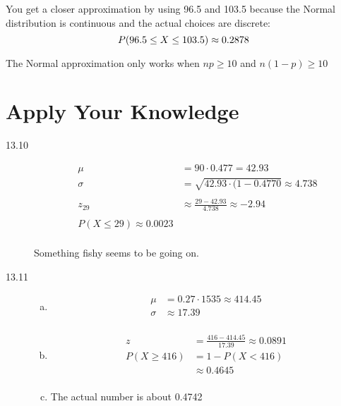 \documentclass[landscape]{exam}
\begin{document}
  You get a closer approximation by using 96.5 and 103.5 because the Normal
  distribution is continuous and the actual choices are discrete:
  \[
    P(96.5 \leq X \leq 103.5) \approx 0.2878 \\
  \]

  The Normal approximation only works when $np \geq 10$ and $n(1 - p) \geq 10$

  \section{Apply Your Knowledge}
  \begin{description}
    \item[13.10]
      \begin{align*}
        \mu &= 90 \cdot 0.477 = 42.93 \\
        \sigma &= \sqrt{42.93 \cdot (1 - 0.4770} \approx 4.738 \\
        \\
        z_{29} &\approx \frac{29 - 42.93}{4.738} \approx -2.94 \\
        \\
        P(X \leq 29) \approx 0.0023 \\
      \end{align*}

      Something fishy seems to be going on.

    \item[13.11]
      \begin{enumerate}[(a)]
        \item 
          \begin{align*}
            \mu    & = 0.27 \cdot 1535 \approx 414.45 \\
            \sigma & \approx 17.39 \\
          \end{align*}

        \item
          \begin{align*}
            z             & = \frac{416 - 414.45}{17.39} \approx 0.0891 \\
            P(X \geq 416) & = 1 - P(X < 416) \\
                          & \approx 0.4645 \\
          \end{align*}

        \item The actual number is about 0.4742

      \end{enumerate}


\end{description}
\end{document}
